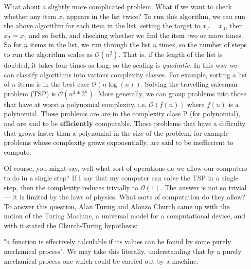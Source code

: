 What about a slightly more complicated problem. What if we want to check whether any item $x_i$ appears
in the list twice? To run this algorithm, we can run the above algorithm for each item in the list, setting the
target to $x_T = x_0$, then $x_T = x_1$ and so forth, and checking whether we find the item two or more
times. So for $n$ items in the list, we run through the list $n$ times, so the number of steps to run
the algorithm scales as $\mathcal{O}(n^2)$. That is, if the length of the list is doubled, it takes
four times as long, so the scaling is \emph{quadratic}.
In this way we can classify algorithms into various complexity classes. For example, sorting a list
of $n$ items is in the best case $\mathcal{O}(n \log(n))$. Solving the travelling salesman problem (TSP) is
$\mathcal{O}(n^2*2^n)$. More generally, we can group problems into those that have at worst a polynomial
complexity, i.e. $\mathcal{O}\left(f(n)\right)$ where $f(n)$ is a polynomial. These problems are are
in the complexity class \textsc{P} (for polynomial), and are said to be \textbf{efficiently} computable.
Those problems that have a difficulty that grows faster than a polynomial in the size of the problem, 
for example problems whose complexity grows exponentially, are said to be inefficcient to compute.

Of course, you might say, well what sort of operations do we allow our computers to do in a single step?
If I say that my computer can solve the TSP in a single step, then the complexity reduces trivially to
$\mathcal{O}(1)$. The answer is not so trivial --- it is limited by the laws of physics. What sorts
of computation do they allow? To answer this question, Alan Turing and Alonzo Church came up with the notion of 
the Turing Machine, a universal model for a computational device, and with it stated the Church-Turing 
hypothesis:

\begin{displayquote}
  "a function is effectively calculable if its values can be found by some purely mechanical process". 
  We may take this literally, understanding that by a purely mechanical process one which could be carried out by a machine.
\end{displayquote}

